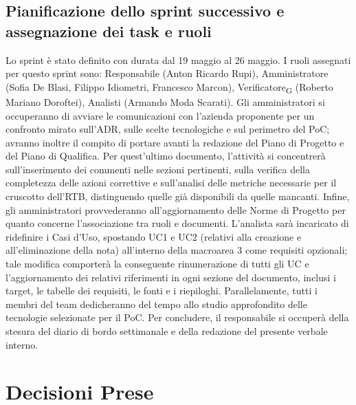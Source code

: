 \subsection{Pianificazione dello sprint successivo e assegnazione dei task e ruoli}
Lo sprint è stato definito con durata dal 19 maggio al 26 maggio. I ruoli assegnati per questo sprint sono: 
Responsabile (Anton Ricardo Rupi), Amministratore (Sofia De Blasi, Filippo Idiometri, Francesco Marcon), Verificatore\textsubscript{G} (Roberto Mariano Doroftei), 
Analisti (Armando Moda Scarati).
Gli amministratori si occuperanno di avviare le comunicazioni con l'azienda proponente per un confronto mirato sull'ADR, sulle scelte tecnologiche e sul perimetro del PoC; 
avranno inoltre il compito di portare avanti la redazione del Piano di Progetto e del Piano di Qualifica. Per quest'ultimo documento, l'attività si concentrerà sull'inserimento 
dei commenti nelle sezioni pertinenti, sulla verifica della completezza delle azioni correttive e sull'analisi delle metriche necessarie per il cruscotto dell'RTB, distinguendo 
quelle già disponibili da quelle mancanti. Infine, gli amministratori provvederanno all'aggiornamento delle Norme di Progetto per quanto concerne l'associazione tra ruoli e documenti. 
L'analista sarà incaricato di ridefinire i Casi d'Uso, spostando UC1 e UC2 (relativi alla creazione e all'eliminazione della nota) all'interno della macroarea 3 come requisiti opzionali; 
tale modifica comporterà la conseguente rinumerazione di tutti gli UC e l'aggiornamento dei relativi riferimenti in ogni sezione del documento, inclusi i target, le tabelle dei requisiti, le fonti e i riepiloghi. 
Parallelamente, tutti i membri del team dedicheranno del tempo allo studio approfondito delle tecnologie selezionate per il PoC. Per concludere, il responsabile si occuperà della stesura del diario di bordo settimanale e della redazione del presente verbale interno.

\section{Decisioni Prese}

